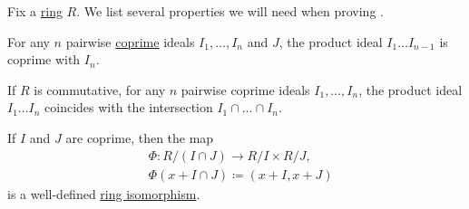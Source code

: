 \begin{lemma}\label{thm:chinese_remainder_theorem_reductions}
  Fix a \hyperref[def:ring]{ring} \( R \). We list several properties we will need when proving .

  \begin{thmenum}
     For any \( n \) pairwise \hyperref[def:semiring_ideal/coprime]{coprime} ideals \( I_1, \ldots, I_n \) and \( J \), the product ideal \( I_1 \ldots I_{n-1} \) is coprime with \( I_n \).

     If \( R \) is commutative, for any \( n \) pairwise coprime ideals \( I_1, \ldots, I_n \), the product ideal \( I_1 \ldots I_n \) coincides with the intersection \( I_1 \cap \ldots \cap I_n \).

     If \( I \) and \( J \) are coprime, then the map
    \begin{equation*}
      \begin{aligned}
        &\Phi: R / (I \cap J) \to R / I \times R / J, \\
        &\Phi(x + I \cap J) \coloneqq (x + I, x + J)
      \end{aligned}
    \end{equation*}
    is a well-defined \hyperref[def:ring/morphism]{ring isomorphism}.
  \end{thmenum}
\end{lemma}
